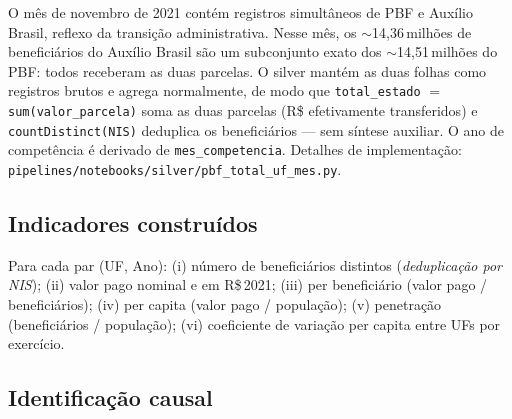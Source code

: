 \documentclass[12pt,a4paper,oneside]{article}
\newcommand{\rs}{R\$\,}
\begin{document}
\begin{tcolorbox}[
  colback=blue!2,colframe=blue!60!black,
  boxrule=0.6pt,arc=2pt,
  left=8pt,right=8pt,top=4pt,bottom=4pt,
  title={\small\textbf{Nota metodológica — tratamento da transição PBF\,$\to$\,AB em novembro de 2021}},
  fonttitle=\small\bfseries,
  ]\small
O mês de novembro de 2021 contém registros simultâneos de PBF e
Auxílio Brasil, reflexo da transição administrativa. Nesse mês,
os $\sim$14,36\,milhões de beneficiários do Auxílio Brasil são um
subconjunto exato dos $\sim$14,51\,milhões do PBF: todos receberam as
duas parcelas. O silver mantém as duas folhas como registros brutos e
agrega normalmente, de modo que \texttt{total\_estado} $=$
\texttt{sum(valor\_parcela)} soma as duas parcelas (R\$ efetivamente
transferidos) e \texttt{countDistinct(NIS)} deduplica os beneficiários
— sem síntese auxiliar. O ano de competência é derivado de
\texttt{mes\_competencia}. Detalhes de implementação:
\texttt{pipelines/notebooks/silver/pbf\_total\_uf\_mes.py}.
\end{tcolorbox}

\subsection{Indicadores construídos}

Para cada par (UF, Ano): (i) número de beneficiários distintos
(\textit{deduplicação por NIS});
(ii) valor pago nominal e em \rs 2021;
(iii) per beneficiário (valor pago / beneficiários);
(iv) per capita (valor pago / população);
(v) penetração (beneficiários / população);
(vi) coeficiente de variação per capita entre UFs por exercício.

\subsection{Identificação causal}
\end{document}

